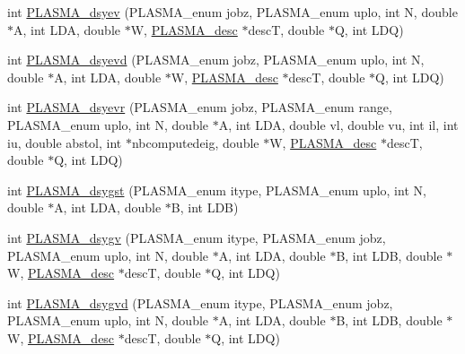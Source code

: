 \begin{DoxyCompactItemize}
\item 
int \hyperlink{group__double_gac7ea19b1441c1325f45c0f6a9cfd8a8a_gac7ea19b1441c1325f45c0f6a9cfd8a8a}{P\+L\+A\+S\+M\+A\+\_\+dsyev} (P\+L\+A\+S\+M\+A\+\_\+enum jobz, P\+L\+A\+S\+M\+A\+\_\+enum uplo, int N, double $\ast$A, int L\+D\+A, double $\ast$W, \hyperlink{structplasma__desc__t}{P\+L\+A\+S\+M\+A\+\_\+desc} $\ast$desc\+T, double $\ast$Q, int L\+D\+Q)
\item 
int \hyperlink{group__double_ga63eb5c9b94563a57c49a86e8a6c93616_ga63eb5c9b94563a57c49a86e8a6c93616}{P\+L\+A\+S\+M\+A\+\_\+dsyevd} (P\+L\+A\+S\+M\+A\+\_\+enum jobz, P\+L\+A\+S\+M\+A\+\_\+enum uplo, int N, double $\ast$A, int L\+D\+A, double $\ast$W, \hyperlink{structplasma__desc__t}{P\+L\+A\+S\+M\+A\+\_\+desc} $\ast$desc\+T, double $\ast$Q, int L\+D\+Q)
\item 
int \hyperlink{group__double_gac40bc729f1349cf26c573be350c92de4_gac40bc729f1349cf26c573be350c92de4}{P\+L\+A\+S\+M\+A\+\_\+dsyevr} (P\+L\+A\+S\+M\+A\+\_\+enum jobz, P\+L\+A\+S\+M\+A\+\_\+enum range, P\+L\+A\+S\+M\+A\+\_\+enum uplo, int N, double $\ast$A, int L\+D\+A, double vl, double vu, int il, int iu, double abstol, int $\ast$nbcomputedeig, double $\ast$W, \hyperlink{structplasma__desc__t}{P\+L\+A\+S\+M\+A\+\_\+desc} $\ast$desc\+T, double $\ast$Q, int L\+D\+Q)
\item 
int \hyperlink{group__double_ga7ab44c615960d36295086012efc45a7d_ga7ab44c615960d36295086012efc45a7d}{P\+L\+A\+S\+M\+A\+\_\+dsygst} (P\+L\+A\+S\+M\+A\+\_\+enum itype, P\+L\+A\+S\+M\+A\+\_\+enum uplo, int N, double $\ast$A, int L\+D\+A, double $\ast$B, int L\+D\+B)
\item 
int \hyperlink{group__double_ga7efdf7cffbb28696c69310d1627a100d_ga7efdf7cffbb28696c69310d1627a100d}{P\+L\+A\+S\+M\+A\+\_\+dsygv} (P\+L\+A\+S\+M\+A\+\_\+enum itype, P\+L\+A\+S\+M\+A\+\_\+enum jobz, P\+L\+A\+S\+M\+A\+\_\+enum uplo, int N, double $\ast$A, int L\+D\+A, double $\ast$B, int L\+D\+B, double $\ast$W, \hyperlink{structplasma__desc__t}{P\+L\+A\+S\+M\+A\+\_\+desc} $\ast$desc\+T, double $\ast$Q, int L\+D\+Q)
\item 
int \hyperlink{group__double_ga10b8c70c33dfee0cbbe6acb17217f717_ga10b8c70c33dfee0cbbe6acb17217f717}{P\+L\+A\+S\+M\+A\+\_\+dsygvd} (P\+L\+A\+S\+M\+A\+\_\+enum itype, P\+L\+A\+S\+M\+A\+\_\+enum jobz, P\+L\+A\+S\+M\+A\+\_\+enum uplo, int N, double $\ast$A, int L\+D\+A, double $\ast$B, int L\+D\+B, double $\ast$W, \hyperlink{structplasma__desc__t}{P\+L\+A\+S\+M\+A\+\_\+desc} $\ast$desc\+T, double $\ast$Q, int L\+D\+Q)
\item 

\end{DoxyCompactItemize}
